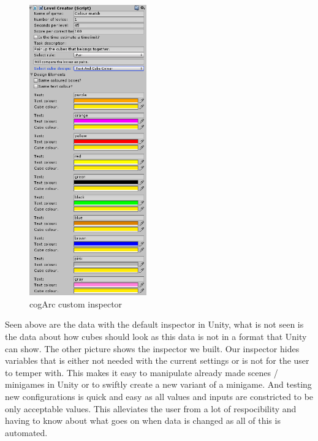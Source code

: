 \begin{figure}
	\capstart
	\includegraphics[width=0.45\textwidth]{images/inspector edited.png}
	\caption{cogArc custom inspector}
\end{figure}

Seen above are the data with the default inspector in Unity, what is not seen is the data about how cubes should look as this data 
is not in a format that Unity can show.
The other picture shows the inspector we built. 
Our inspector hides variables that is either not needed with the current settings or is not for the user to temper with.
This makes it easy to manipulate already made scenes / minigames in Unity or to swiftly create a new variant of a minigame.
And testing new configurations is quick and easy as all values and inputs are constricted to be only acceptable values.
This alleviates the user from a lot of respocibility and having to know about what goes on when data is changed as all of this is automated.

